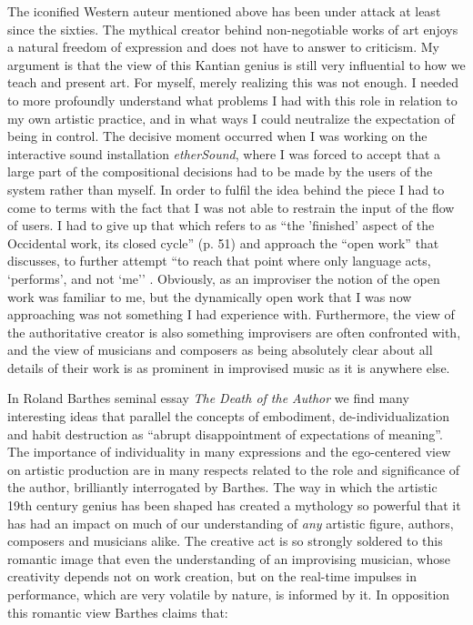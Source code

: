 \documentclass[a4paper,hidelinks]{article}
\begin{document}
The iconified Western auteur mentioned above has been under attack at least since the sixties. The mythical creator behind non-negotiable works of art enjoys a natural freedom of expression and does not have to answer to criticism. My argument \citep{frisk08} is that the view of this Kantian genius is still very influential to how we teach and present art. For myself, merely realizing this was not enough. I needed to more profoundly understand what problems I had with this role in relation to my own artistic practice, and in what ways I could neutralize the expectation of being in control. The decisive moment occurred when I was working on the interactive sound installation \emph{etherSound}, where I was forced to accept that a large part of the compositional decisions had to be made by the users of the system rather than myself. In order to fulfil the idea behind the piece I had to come to terms with the fact that I was not able to restrain the input of the flow of users. I had to give up that which \citet{boulez64} refers to as ``the 'finished' aspect of the Occidental work, its closed cycle'' (p. 51) and approach the ``open work'' that \citet{eco68} discusses, to further attempt ``to reach that point where only language acts, `performs', and not `me'' \citep{barthes77}. Obviously, as an improviser the notion of the open work was familiar to me, but the dynamically open work that I was now approaching was not something I had experience with. Furthermore, the view of the authoritative creator is also something improvisers are often confronted with, and the view of musicians and composers as being absolutely clear about all details of their work is as prominent in improvised music as it is anywhere else. 

In Roland Barthes seminal essay \emph{The Death of the Author} we find many interesting ideas that parallel the concepts of embodiment, de-individualization and habit destruction as ``abrupt disappointment of expectations of meaning''\citep{barthes77}. The importance of individuality in many expressions and the ego-centered view on artistic production are in many respects related to the role and significance of the author, brilliantly interrogated by Barthes. The way in which the artistic 19th century genius has been shaped has created a mythology so powerful that it has had an impact on much of our understanding of \emph{any} artistic figure, authors, composers and musicians alike. The creative act is so strongly soldered to this romantic image that even the understanding of an improvising musician, whose creativity depends not on work creation, but on the real-time impulses in performance, which are very volatile by nature, is informed by it. In opposition this romantic view Barthes claims that:
\end{document}
